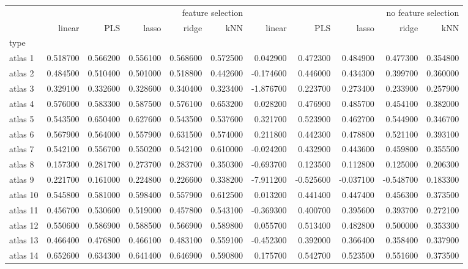 \documentclass[a4paper]{article}
\begin{document}
\thispagestyle{empty}
\begin{landscape}
\begin{tabular}{lrrrrrrrrrr}
\toprule
 & \multicolumn{5}{r}{feature selection} & \multicolumn{5}{r}{no feature selection} \\
 & linear & PLS & lasso & ridge & kNN & linear & PLS & lasso & ridge & kNN \\
type &  &  &  &  &  &  &  &  &  &  \\
\midrule
atlas 1 & 0.518700 & 0.566200 & 0.556100 & 0.568600 & 0.572500 & 0.042900 & 0.472300 & 0.484900 & 0.477300 & 0.354800 \\
atlas 2 & 0.484500 & 0.510400 & 0.501000 & 0.518800 & 0.442600 & -0.174600 & 0.446000 & 0.434300 & 0.399700 & 0.360000 \\
atlas 3 & 0.329100 & 0.332600 & 0.328600 & 0.340400 & 0.323400 & -1.876700 & 0.223700 & 0.273400 & 0.233900 & 0.257900 \\
atlas 4 & 0.576000 & 0.583300 & 0.587500 & 0.576100 & 0.653200 & 0.028200 & 0.476900 & 0.485700 & 0.454100 & 0.382000 \\
atlas 5 & 0.543500 & 0.650400 & 0.627600 & 0.543500 & 0.537600 & 0.321700 & 0.523900 & 0.462700 & 0.544900 & 0.346700 \\
atlas 6 & 0.567900 & 0.564000 & 0.557900 & 0.631500 & 0.574000 & 0.211800 & 0.442300 & 0.478800 & 0.521100 & 0.393100 \\
atlas 7 & 0.542100 & 0.556700 & 0.550200 & 0.542100 & 0.610000 & -0.024200 & 0.432900 & 0.443600 & 0.459800 & 0.355500 \\
atlas 8 & 0.157300 & 0.281700 & 0.273700 & 0.283700 & 0.350300 & -0.693700 & 0.123500 & 0.112800 & 0.125000 & 0.206300 \\
atlas 9 & 0.221700 & 0.161000 & 0.224800 & 0.226600 & 0.338200 & -7.911200 & -0.525600 & -0.037100 & -0.548700 & 0.183300 \\
atlas 10 & 0.545800 & 0.581000 & 0.598400 & 0.557900 & 0.612500 & 0.013200 & 0.441400 & 0.447400 & 0.456300 & 0.373500 \\
atlas 11 & 0.456700 & 0.530600 & 0.519000 & 0.457800 & 0.543100 & -0.369300 & 0.400700 & 0.395600 & 0.393700 & 0.272100 \\
atlas 12 & 0.550600 & 0.586900 & 0.588500 & 0.566900 & 0.589800 & 0.055700 & 0.513400 & 0.482800 & 0.500000 & 0.353300 \\
atlas 13 & 0.466400 & 0.476800 & 0.466100 & 0.483100 & 0.559100 & -0.452300 & 0.392000 & 0.366400 & 0.358400 & 0.337900 \\
atlas 14 & 0.652600 & 0.634300 & 0.641400 & 0.646900 & 0.590800 & 0.175700 & 0.542700 & 0.523500 & 0.551600 & 0.373500 \\

\end{tabular}
\end{landscape}
\end{document}
